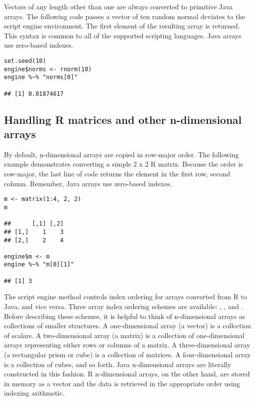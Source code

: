 Vectors of any length other than one are always converted to primitive Java arrays. The following code passes a vector of ten random normal deviates to the script engine environment. The first element of the resulting array is returned. This syntax is common to all of the supported scripting languages.  Java arrays use zero-based indexes.

\begin{verbatim}
set.seed(10)
engine$norms <- rnorm(10)
engine %~% "norms[0]"

## [1] 0.01874617
\end{verbatim}

\subsection{Handling R matrices and other n-dimensional arrays}

By default, n-dimensional arrays are copied in row-major order. The following example demonstrates converting a simple 2 x 2 R matrix. Because the order is row-major, the last line of code returns the element in the first row, second column. Remember, Java arrays use zero-based indexes.

\begin{verbatim}
m <- matrix(1:4, 2, 2)
m

##      [,1] [,2]
## [1,]    1    3
## [2,]    2    4

engine$m <- m
engine %~% "m[0][1]"

## [1] 3
\end{verbatim}

The  script engine method controls index ordering for arrays converted from R to Java, and vice versa. Three array index ordering schemes are available: , , and . Before describing these schemes, it is helpful to think of n-dimensional arrays as collections of smaller structures. A one-dimensional array (a vector) is a collection of scalars. A two-dimensional array (a matrix) is a collection of one-dimensional arrays representing either rows or columns of a matrix. A three-dimensional array (a rectangular prism or cube) is a collection of matrices. A four-dimensional array is a collection of cubes, and so forth. Java n-dimensional arrays are literally constructed in this fashion. R n-dimensional arrays, on the other hand, are stored in memory as a vector and the data is retrieved in the appropriate order using indexing arithmetic.

